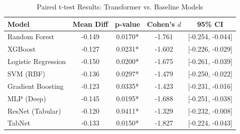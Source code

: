 \begin{table}[htbp]
\centering
\caption{Paired t-test Results: Transformer vs. Baseline Models}
\label{tab:statistical_tests}
\begin{tabular}{lcccc}
\toprule
Model & Mean Diff & p-value & Cohen's $d$ & 95\% CI \\
\midrule
Random Forest & -0.149 & 0.0170* & -1.761 & [-0.254, -0.044] \\
XGBoost & -0.127 & 0.0231* & -1.602 & [-0.226, -0.029] \\
Logistic Regression & -0.150 & 0.0200* & -1.675 & [-0.261, -0.039] \\
SVM (RBF) & -0.136 & 0.0297* & -1.479 & [-0.250, -0.022] \\
Gradient Boosting & -0.123 & 0.0335* & -1.423 & [-0.231, -0.016] \\
MLP (Deep) & -0.145 & 0.0195* & -1.688 & [-0.251, -0.038] \\
ResNet (Tabular) & -0.120 & 0.0411* & -1.329 & [-0.232, -0.008] \\
TabNet & -0.133 & 0.0150* & -1.827 & [-0.224, -0.043] \\
\bottomrule
\end{tabular}
\end{table}
